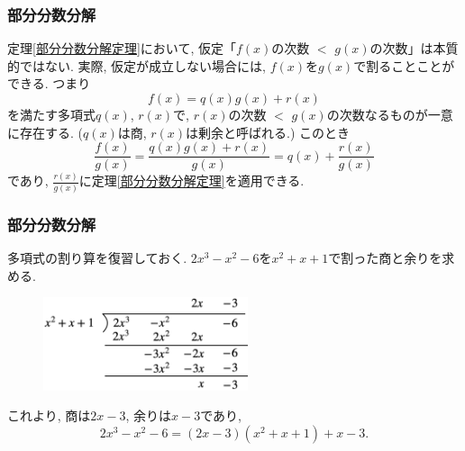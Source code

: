 \documentclass[dvipdfmx,cjk,10.2pt]{beamer}
\theoremstyle{definition}
\begin{document}
\begin{frame}
\frametitle{部分分数分解}

定理\ref{部分分数分解定理}において, 仮定「$f(x)$の次数 $<$  $g(x)$の次数」は本質的ではない. 
実際, 仮定が成立しない場合には, $f(x)$を$g(x)$で割ることことができる. つまり
$$
f(x)=q(x)g(x)+r(x)
$$
を満たす多項式$q(x)$, $r(x)$で, $r(x)$の次数 $<$  $g(x)$の次数なるものが一意に存在する. 
($q(x)$は商, $r(x)$は剰余と呼ばれる.) 
このとき
$$
\frac{f(x)}{g(x)}=\frac{q(x)g(x)+r(x)}{g(x)}=q(x)+\frac{r(x)}{g(x)}
$$
であり, $\frac{r(x)}{g(x)}$に定理\ref{部分分数分解定理}を適用できる. 


\end{frame}






\begin{frame}
\frametitle{部分分数分解}

多項式の割り算を復習しておく. 
$2x^3-x^2-6$を$x^2+x+1$で割った商と余りを求める. 

\vspace{-2mm}

 \begin{figure}[htbp]
 \begin{center} 
  \includegraphics[width=60mm]{poly_quot.png}
 \end{center}
\end{figure}
これより, 商は$2x-3$, 余りは$x-3$であり, 
$$
2x^3-x^2-6 = (2x-3)(x^2+x+1)+x-3. 
$$

\end{frame}



\end{document}
